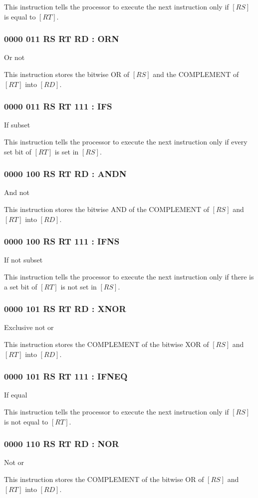 \documentclass[12pt,letterpaper]{report}
\newcommand{\reg}[1]{\left[#1\right]}
\begin{document}
This instruction tells the processor to execute the next instruction only if $\reg{RS}$ is equal to $\reg{RT}$.
\subsubsection{0000 011  RS  RT  RD : ORN}
Or not

This instruction stores the bitwise OR of $\reg{RS}$ and the COMPLEMENT of $\reg{RT}$ into $\reg{RD}$.
\subsubsection{0000 011  RS  RT 111 : IFS}
If subset

This instruction tells the processor to execute the next instruction only if every set bit of $\reg{RT}$ is set in $\reg{RS}$.
\subsubsection{0000 100  RS  RT  RD : ANDN}
And not

This instruction stores the bitwise AND of the COMPLEMENT of $\reg{RS}$ and $\reg{RT}$ into $\reg{RD}$.
\subsubsection{0000 100  RS  RT 111 : IFNS}
If not subset

This instruction tells the processor to execute the next instruction only if there is a set bit of $\reg{RT}$ is not set in $\reg{RS}$.
\subsubsection{0000 101  RS  RT  RD : XNOR}
Exclusive not or

This instruction stores the COMPLEMENT of the bitwise XOR of $\reg{RS}$ and $\reg{RT}$ into $\reg{RD}$.
\subsubsection{0000 101  RS  RT 111 : IFNEQ}
If equal

This instruction tells the processor to execute the next instruction only if $\reg{RS}$ is not equal to $\reg{RT}$.
\subsubsection{0000 110  RS  RT  RD : NOR}
Not or

This instruction stores the COMPLEMENT of the bitwise OR of $\reg{RS}$ and $\reg{RT}$ into $\reg{RD}$.
\end{document}
